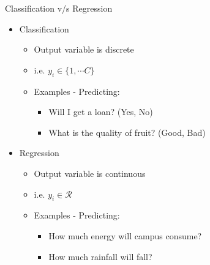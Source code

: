 \documentclass[usenames,dvipsnames]{beamer}
\begin{document}
\begin{frame}{Classification v/s Regression}
\begin{itemize}
	\item Classification
	\begin{itemize}
		\item \pause Output variable is discrete
		\item \pause i.e.  $y_i\in \{1, \cdots C\}$ 
		\item \pause Examples - Predicting: 
		\begin{itemize}
			\item \pause Will I get a loan? (Yes, No)
			\item \pause What is the quality of fruit? (Good, Bad)
		\end{itemize}
	\end{itemize}
	\item \pause Regression
	\begin{itemize}
		\item \pause Output variable is continuous
		\item \pause i.e.  $y_i\in \mathcal{R}$ 
		\item \pause Examples - Predicting: 
		\begin{itemize}
			\item \pause How much energy will campus consume? 
			\item \pause How much rainfall will fall?
		\end{itemize}
	\end{itemize}
\end{itemize}

\end{frame}
\end{document}
